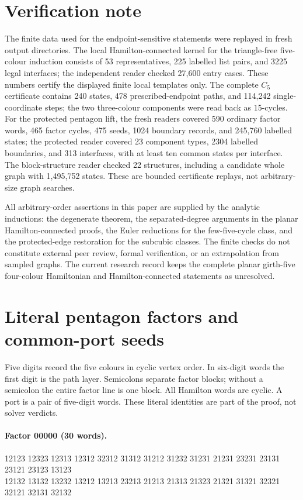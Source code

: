 \documentclass[11pt]{article}
\theoremstyle{remark}
\numberwithin{equation}{section}
\begin{document}
\section{Verification note}
\label{sec:verification}

The finite data used for the endpoint-sensitive statements were replayed in fresh output directories.  The local Hamilton-connected kernel for the triangle-free five-colour induction consists of 53 representatives, 225 labelled list pairs, and 3225 legal interfaces; the independent reader checked 27,600 entry cases.  These numbers certify the displayed finite local templates only.  The complete $C_5$ certificate contains 240 states, 478 prescribed-endpoint paths, and 114,242 single-coordinate steps; the two three-colour components were read back as $15$-cycles.  For the protected pentagon lift, the fresh readers covered 590 ordinary factor words, 465 factor cycles, 475 seeds, 1024 boundary records, and 245,760 labelled states; the protected reader covered 23 component types, 2304 labelled boundaries, and 313 interfaces, with at least ten common states per interface.  The block-structure reader checked 22 structures, including a candidate whole graph with 1,495,752 states.  These are bounded certificate replays, not arbitrary-size graph searches.

All arbitrary-order assertions in this paper are supplied by the analytic inductions: the degenerate theorem, the separated-degree arguments in the planar Hamilton-connected proofs, the Euler reductions for the few-five-cycle class, and the protected-edge restoration for the subcubic classes.  The finite checks do not constitute external peer review, formal verification, or an extrapolation from sampled graphs.  The current research record keeps the complete planar girth-five four-colour Hamiltonian and Hamilton-connected statements as unresolved.

\appendix
\section{Literal pentagon factors and common-port seeds}
\label{app:pentagon-factor-words}
Five digits record the five colours in cyclic vertex order. In six-digit
words the first digit is the path layer. Semicolons separate factor blocks;
without a semicolon the entire factor line is one block.
All Hamilton words are cyclic. A port is a pair of five-digit words.
These literal identities are part of the proof, not solver verdicts.
\paragraph{Factor 00000 (30 words).}
\begingroup\footnotesize\ttfamily\begin{flushleft}
12123 12323 12313 12312 32312 31312 31212 31232 31231 21231 23231 23131 23121 23123 13123\\
12132 13132 13232 13212 13213 23213 21213 21313 21323 21321 31321 32321 32121 32131 32132\\
\end{flushleft}\endgroup
\end{document}
